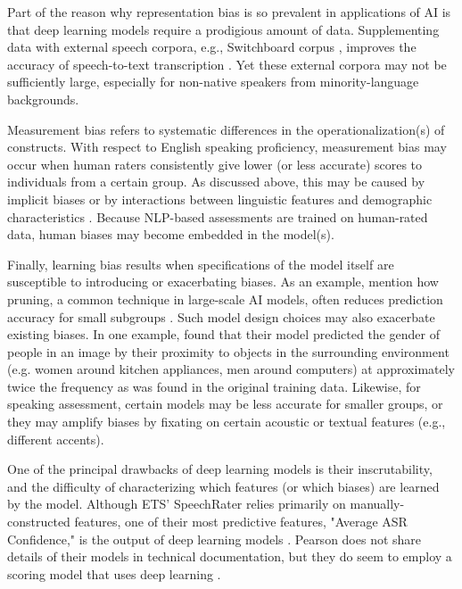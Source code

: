 \documentclass [PhD] {uclathes}
\begin{document}
Part of the reason why representation bias is so prevalent in applications of AI is that deep learning models require a prodigious amount of data. Supplementing data with external speech corpora, e.g., Switchboard corpus \citep{godfrey1997switchboard}, improves the accuracy of speech-to-text transcription \citep{qian2019automatic}. Yet these external corpora may not be sufficiently large, especially for non-native speakers from minority-language backgrounds.

Measurement bias refers to systematic differences in the operationalization(s) of constructs. With respect to English speaking proficiency, measurement bias may occur when human raters consistently give lower (or less accurate) scores to individuals from a certain group. As discussed above, this may be caused by implicit biases \citep{spencer2016} or by interactions between linguistic features and demographic characteristics \citep{zhang2019assessing}. Because NLP-based assessments are trained on human-rated data, human biases may become embedded in the model(s).

Finally, learning bias results when specifications of the model itself are susceptible to introducing or exacerbating biases. As an example, \citet{suresh2021framework} mention how pruning, a common technique in large-scale AI models, often reduces prediction accuracy for small subgroups \citep{hooker2020characterising}. Such model design choices may also exacerbate existing biases. In one example, \citet{zhao2017men} found that their model predicted the gender of people in an image by their proximity to objects in the surrounding environment (e.g. women around kitchen appliances, men around computers) at approximately twice the frequency as was found in the original training data. Likewise, for speaking assessment, certain models may be less accurate for smaller groups, or they may amplify biases by fixating on certain acoustic or textual features (e.g., different accents).

One of the principal drawbacks of deep learning models is their inscrutability, and the difficulty of characterizing which features (or which biases) are learned by the model. Although ETS' SpeechRater relies primarily on manually-constructed features, one of their most predictive features, "Average ASR Confidence," is the output of deep learning models \citep{qian2019automatic}. Pearson does not share details of their models in technical documentation, but they do seem to employ a scoring model that uses deep learning \citep{cheng2014automatic}.
\end{document}

